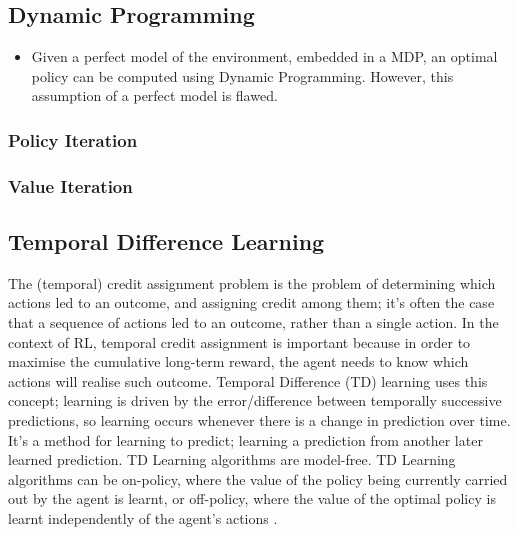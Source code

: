 \subsection{Dynamic Programming}
\begin{itemize}
\item Given a perfect model of the environment, embedded in a MDP, an optimal policy can be computed using Dynamic Programming. However, this assumption of a perfect model is flawed.
\end{itemize}
\subsubsection{Policy Iteration}
\subsubsection{Value Iteration}
\subsection{Temporal Difference Learning}
The (temporal) credit assignment problem \cite{Minsky:1961:ire} is the problem of determining which actions led to an outcome, and assigning credit among them; it's often the case that a sequence of actions led to an outcome, rather than a single action. In the context of RL, temporal credit assignment is important because in order to maximise the cumulative long-term reward, the agent needs to know which actions will realise such outcome. Temporal Difference (TD) \cite{10.5555/911176, 5392560} learning uses this concept; learning is driven by the error/difference between temporally successive predictions, so learning occurs whenever there is a change in prediction over time. It's a method for learning to predict; learning a prediction from another later learned prediction.
TD Learning algorithms are model-free.
TD Learning algorithms can be on-policy, where the value of the policy being currently carried out by the agent is learnt, or off-policy, where the value of the optimal policy is learnt independently of the agent's actions \cite{PooleMackworth17}.
